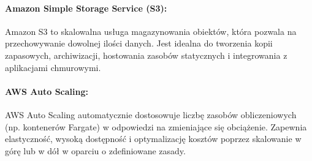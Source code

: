\documentclass[../../main.tex]{subfiles}
\begin{document}
        \paragraph{Amazon Simple Storage Service (S3):}
        Amazon S3 to skalowalna usługa magazynowania obiektów, która pozwala na przechowywanie dowolnej ilości danych. Jest idealna do tworzenia kopii zapasowych, archiwizacji, hostowania zasobów statycznych i integrowania z aplikacjami chmurowymi.
        
        \paragraph{AWS Auto Scaling:}
        AWS Auto Scaling automatycznie dostosowuje liczbę zasobów obliczeniowych (np. kontenerów Fargate) w odpowiedzi na zmieniające się obciążenie. Zapewnia elastyczność, wysoką dostępność i optymalizację kosztów poprzez skalowanie w górę lub w dół w oparciu o zdefiniowane zasady.
    
\end{document}
